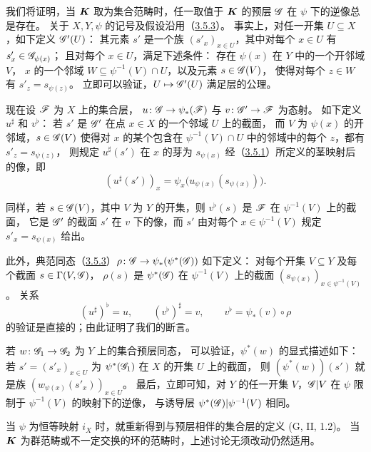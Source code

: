 我们将证明，当 $\boldsymbol K$ 取为集合范畴时，任一取值于 $\boldsymbol K$ 的预层 $\mathscr G$ 在 $\psi$ 下的逆像总是存在。
关于 $X,Y,\psi$ 的记号及假设沿用（\hyperlink{para:0:3.5.3}{3.5.3}）。
事实上，对任一开集 $U\subseteq X$，如下定义 $\mathscr G'(U)$：
其元素 $s'$ 是一个族 $(s'_x)_{x\in U}$，其中对每个 $x\in U$ 有 $s'_x\in\mathscr G_{\psi(x)}$；
且对每个 $x\in U$，满足下述条件：
存在 $\psi(x)$ 在 $Y$ 中的一个开邻域 $V$，
$x$ 的一个邻域 $W\subseteq\psi^{-1}(V)\cap U$，以及元素 $s\in\mathscr G(V)$，
使得对每个 $z\in W$ 有 $s'_z=s_{\psi(z)}$。
立即可以验证，$U\mapsto\mathscr G'(U)$ 满足层的公理。

现在设 $\mathscr F$ 为 $X$ 上的集合层，
$u\colon\mathscr G\to\psi_*(\mathscr F)$ 与 $v\colon\mathscr G'\to\mathscr F$ 为态射。
如下定义 $u^\sharp$ 和 $v^\flat$：
若 $s'$ 是 $\mathscr G'$ 在点 $x\in X$ 的一个邻域 $U$ 上的截面，
而 $V$ 为 $\psi(x)$ 的开邻域，$s\in\mathscr G(V)$ 使得对 $x$ 的某个包含在
$\psi^{-1}(V)\cap U$ 中的邻域中的每个 $z$，都有 $s'_z=s_{\psi(z)}$，
则规定 $u^\sharp(s')$ 在 $x$ 的芽为 $s_{\psi(x)}$ 经（\hyperlink{para:0:3.5.1}{3.5.1}）所定义的茎映射后的像，即
\[
 (u^\sharp(s'))_x=\psi_x\bigl(u_{\psi(x)}(s_{\psi(x)})\bigr).
\]

同样，若 $s\in\mathscr G(V)$，其中 $V$ 为 $Y$ 的开集，则 $v^\flat(s)$ 是 $\mathscr F$ 在 $\psi^{-1}(V)$ 上的截面，
它是 $\mathscr G'$ 的截面 $s'$ 在 $v$ 下的像，而 $s'$ 由对每个 $x\in\psi^{-1}(V)$ 规定
$s'_x=s_{\psi(x)}$ 给出。

此外，典范同态（\hyperlink{para:0:3.5.3}{3.5.3}）$\rho\colon\mathscr G\to\psi_*(\psi^*(\mathscr G))$ 如下定义：
对每个开集 $V\subseteq Y$ 及每个截面 $s\in\Gamma(V,\mathscr G)$，
$\rho(s)$ 是 $\psi^*(\mathscr G)$ 在 $\psi^{-1}(V)$ 上的截面
$(s_{\psi(x)})_{x\in\psi^{-1}(V)}$。
关系
\[
 (u^\sharp)^\flat=u,\qquad (v^\flat)^\sharp=v,
 \qquad v^\flat=\psi_*(v)\circ\rho
\]
的验证是直接的；由此证明了我们的断言。

若 $w\colon\mathscr G_1\to\mathscr G_2$ 为 $Y$ 上的集合预层同态，
可以验证，$\psi^*(w)$ 的显式描述如下：
若 $s'=(s'_x)_{x\in U}$ 为 $\psi^*(\mathscr G_1)$ 在 $X$ 的开集 $U$ 上的截面，
则 $(\psi^*(w))(s')$ 就是族 $(w_{\psi(x)}(s'_x))_{x\in U}$。
最后，立即可知，对 $Y$ 的任一开集 $V$，$\mathscr G|V$ 在 $\psi$ 限制于 $\psi^{-1}(V)$ 的映射下的逆像，
与诱导层 $\psi^*(\mathscr G)|\psi^{-1}(V)$ 相同。

当 $\psi$ 为恒等映射 $i_X$ 时，就重新得到与预层相伴的集合层的定义 (G, II, 1.2)。
当 $\boldsymbol K$ 为群范畴或不一定交换的环的范畴时，上述讨论无须改动仍然适用。

